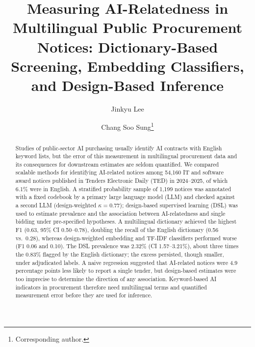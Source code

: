 \documentclass[runningheads]{llncs}
\begin{document}
\title{Measuring AI-Relatedness in Multilingual Public Procurement Notices: Dictionary-Based Screening, Embedding Classifiers, and Design-Based Inference}
\author{Jinkyu Lee \and Chang Soo Sung\thanks{Corresponding author.}}
\maketitle

\begin{abstract}
Studies of public-sector AI purchasing usually identify AI contracts with English keyword lists, but the error of this measurement in multilingual procurement data and its consequences for downstream estimates are seldom quantified. We compared scalable methods for identifying AI-related notices among 54,160 IT and software award notices published in Tenders Electronic Daily (TED) in 2024--2025, of which 6.1\% were in English. A stratified probability sample of 1,199 notices was annotated with a fixed codebook by a primary large language model (LLM) and checked against a second LLM (design-weighted $\kappa=0.77$); design-based supervised learning (DSL) was used to estimate prevalence and the association between AI-relatedness and single bidding under pre-specified hypotheses. A multilingual dictionary achieved the highest F1 (0.63, 95\% CI 0.50--0.78), doubling the recall of the English dictionary (0.56 vs.\ 0.28), whereas design-weighted embedding and TF-IDF classifiers performed worse (F1 0.06 and 0.10). The DSL prevalence was 2.32\% (CI 1.57--3.21\%), about three times the 0.83\% flagged by the English dictionary; the excess persisted, though smaller, under adjudicated labels. A naive regression suggested that AI-related notices were 4.9 percentage points less likely to report a single tender, but design-based estimates were too imprecise to determine the direction of any association. Keyword-based AI indicators in procurement therefore need multilingual terms and quantified measurement error before they are used for inference.
\end{abstract}
\end{document}
